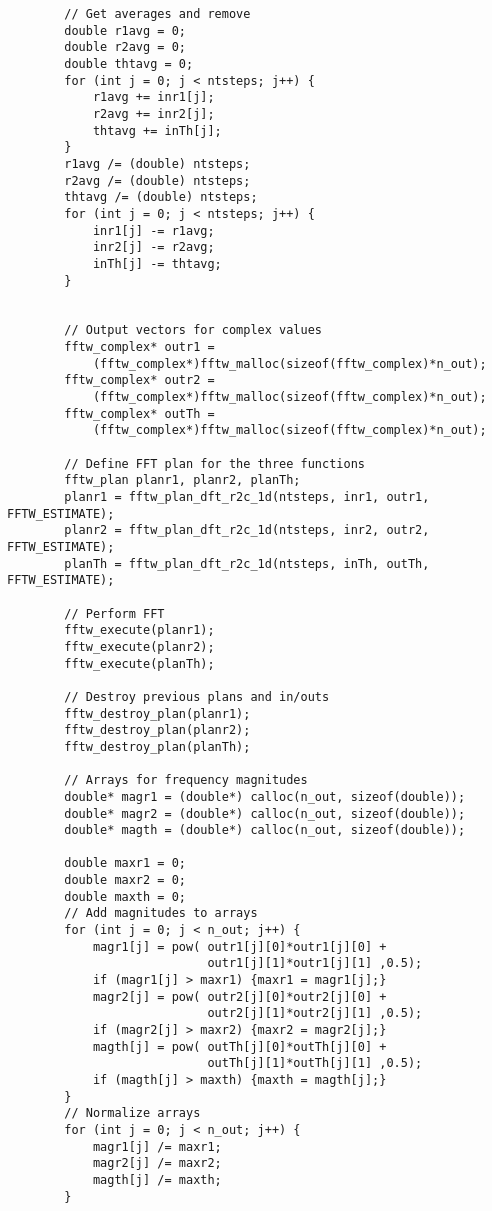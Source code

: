\begin{singlespace}
\begin{verbatim}
        // Get averages and remove
        double r1avg = 0;
        double r2avg = 0;
        double thtavg = 0;
        for (int j = 0; j < ntsteps; j++) {
            r1avg += inr1[j];
            r2avg += inr2[j];
            thtavg += inTh[j];
        }
        r1avg /= (double) ntsteps;
        r2avg /= (double) ntsteps;
        thtavg /= (double) ntsteps;
        for (int j = 0; j < ntsteps; j++) {
            inr1[j] -= r1avg;
            inr2[j] -= r2avg;
            inTh[j] -= thtavg;
        }


        // Output vectors for complex values
        fftw_complex* outr1 = 
            (fftw_complex*)fftw_malloc(sizeof(fftw_complex)*n_out);
        fftw_complex* outr2 = 
            (fftw_complex*)fftw_malloc(sizeof(fftw_complex)*n_out);
        fftw_complex* outTh = 
            (fftw_complex*)fftw_malloc(sizeof(fftw_complex)*n_out);

        // Define FFT plan for the three functions
        fftw_plan planr1, planr2, planTh;
        planr1 = fftw_plan_dft_r2c_1d(ntsteps, inr1, outr1, FFTW_ESTIMATE);
        planr2 = fftw_plan_dft_r2c_1d(ntsteps, inr2, outr2, FFTW_ESTIMATE);
        planTh = fftw_plan_dft_r2c_1d(ntsteps, inTh, outTh, FFTW_ESTIMATE);

        // Perform FFT
        fftw_execute(planr1);
        fftw_execute(planr2);
        fftw_execute(planTh);

        // Destroy previous plans and in/outs
        fftw_destroy_plan(planr1);
        fftw_destroy_plan(planr2);
        fftw_destroy_plan(planTh);

        // Arrays for frequency magnitudes
        double* magr1 = (double*) calloc(n_out, sizeof(double));
        double* magr2 = (double*) calloc(n_out, sizeof(double));
        double* magth = (double*) calloc(n_out, sizeof(double));

        double maxr1 = 0;
        double maxr2 = 0;
        double maxth = 0;
        // Add magnitudes to arrays
        for (int j = 0; j < n_out; j++) {
            magr1[j] = pow( outr1[j][0]*outr1[j][0] + 
                            outr1[j][1]*outr1[j][1] ,0.5);
            if (magr1[j] > maxr1) {maxr1 = magr1[j];}
            magr2[j] = pow( outr2[j][0]*outr2[j][0] + 
                            outr2[j][1]*outr2[j][1] ,0.5);
            if (magr2[j] > maxr2) {maxr2 = magr2[j];}
            magth[j] = pow( outTh[j][0]*outTh[j][0] + 
                            outTh[j][1]*outTh[j][1] ,0.5);
            if (magth[j] > maxth) {maxth = magth[j];}
        }
        // Normalize arrays
        for (int j = 0; j < n_out; j++) {
            magr1[j] /= maxr1;
            magr2[j] /= maxr2;
            magth[j] /= maxth;
        }


\end{verbatim}
\end{singlespace}
